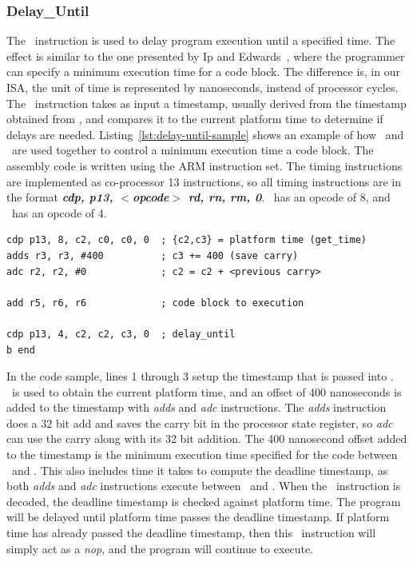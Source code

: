 \subsubsection{Delay\_Until}
The \delayuntil\ instruction is used to delay program execution until a specified time.
The effect is similar to the one presented by Ip and Edwards~\cite{ip2006processor}, where the programmer can specify a minimum execution time for a code block.
The difference is, in our ISA, the unit of time is represented by nanoseconds, instead of processor cycles.
The \delayuntil\ instruction takes as input a timestamp, usually derived from the timestamp obtained from \gettime, and compares it to the current platform time to determine if delays are needed.
Listing~\ref{lst:delay-until-sample} shows an example of how \delayuntil\ and \gettime\ are used together to control a minimum execution time a code block.
The assembly code is written using the ARM instruction set.
The timing instructions are implemented as co-processor 13 instructions, so all timing instructions are in the format \textbf{\textit{cdp, p13, $<$opcode$>$ rd, rn, rm, 0}}.
\Gettime\ has an opcode of 8, and \delayuntil\ has an opcode of 4.

\begin{lstlisting}[float=h, label=lst:delay-until-sample,caption=Sample assembly code of delay\_until ]
cdp p13, 8, c2, c0, c0, 0  ; {c2,c3} = platform time (get_time)
adds r3, r3, #400          ; c3 += 400 (save carry)
adc r2, r2, #0             ; c2 = c2 + <previous carry> 

add r5, r6, r6             ; code block to execution

cdp p13, 4, c2, c2, c3, 0  ; delay_until 
b end
\end{lstlisting}

In the code sample, lines 1 through 3 setup the timestamp that is passed into \delayuntil. 
\Gettime\ is used to obtain the current platform time, and an offset of 400 nanoseconds is added to the timestamp with \emph{adds} and \emph{adc} instructions.
The \emph{adds} instruction does a 32 bit add and saves the carry bit in the processor state register, so \emph{adc} can use the carry along with its 32 bit addition.
The 400 nanosecond offset added to the timestamp is the minimum execution time specified for the code between \gettime\ and \delayuntil.
This also includes time it takes to compute the deadline timestamp, as both \emph{adds} and \emph{adc} instructions execute between \gettime\ and \delayuntil.
When the \delayuntil\ instruction is decoded, the deadline timestamp is checked against platform time.
The program will be delayed until platform time passes the deadline timestamp. 
If platform time has already passed the deadline timestamp, then this \delayuntil\ instruction will simply act as a \emph{nop}, and the program will continue to execute. 

